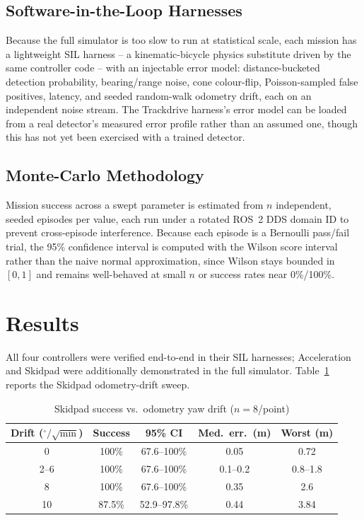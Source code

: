 \documentclass[conference]{IEEEtran}
\begin{document}
\subsection{Software-in-the-Loop Harnesses}
Because the full simulator is too slow to run at statistical scale, each mission has a lightweight SIL harness -- a kinematic-bicycle physics substitute driven by the same controller code -- with an injectable error model: distance-bucketed detection probability, bearing/range noise, cone colour-flip, Poisson-sampled false positives, latency, and seeded random-walk odometry drift, each on an independent noise stream. The Trackdrive harness's error model can be loaded from a real detector's measured error profile rather than an assumed one, though this has not yet been exercised with a trained detector.

\subsection{Monte-Carlo Methodology}
Mission success across a swept parameter is estimated from $n$ independent, seeded episodes per value, each run under a rotated ROS~2 DDS domain ID to prevent cross-episode interference. Because each episode is a Bernoulli pass/fail trial, the 95\% confidence interval is computed with the Wilson score interval \cite{wilson1927} rather than the naive normal approximation, since Wilson stays bounded in $[0,1]$ and remains well-behaved at small $n$ or success rates near 0\%/100\%.

\section{Results}
\label{sec:results}

All four controllers were verified end-to-end in their SIL harnesses; Acceleration and Skidpad were additionally demonstrated in the full simulator. Table~\ref{tab:sweep} reports the Skidpad odometry-drift sweep.

\begin{table}[t]
\centering
\caption{Skidpad success vs.\ odometry yaw drift ($n{=}8$/point)}
\label{tab:sweep}
\begin{tabular}{@{}ccccc@{}}
\toprule
Drift ($^{\circ}/\sqrt{\text{min}}$) & Success & 95\% CI & Med.\ err.\ (m) & Worst (m) \\
\midrule
0 & 100\% & 67.6--100\% & 0.05 & 0.72 \\
2--6 & 100\% & 67.6--100\% & 0.1--0.2 & 0.8--1.8 \\
8 & 100\% & 67.6--100\% & 0.35 & 2.6 \\
10 & 87.5\% & 52.9--97.8\% & 0.44 & 3.84 \\
\bottomrule
\end{tabular}
\end{table}
\end{document}
